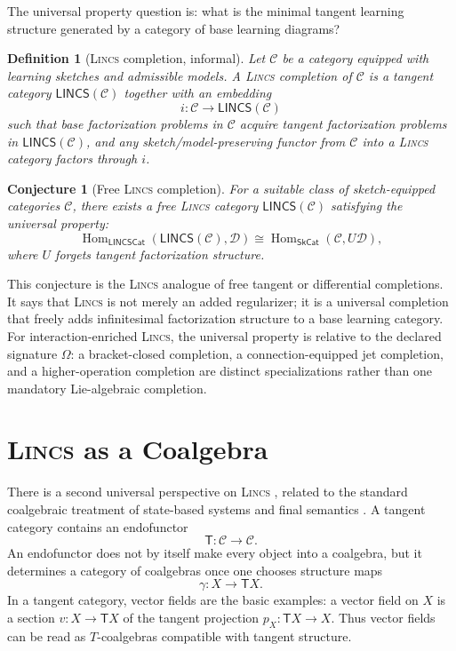\documentclass{article}
\newtheorem{definition}{Definition}
\newtheorem{conjecture}{Conjecture}
\newcommand{\C}{\mathcal{C}}
\newcommand{\D}{\mathcal{D}}
\newcommand{\T}{\mathsf{T}}
\newcommand{\LINCS}{\mathsf{LINCS}}
\newcommand{\Hom}{\operatorname{Hom}}
\begin{document}
The universal property question is: what is the minimal tangent learning structure generated by a category of base learning diagrams?

\begin{definition}[\textsc{Lincs}   completion, informal]
Let \(\C\) be a category equipped with learning sketches and admissible models. A \textsc{Lincs}   completion of \(\C\) is a tangent category \(\LINCS(\C)\) together with an embedding
\[
i:\C\to\LINCS(\C)
\]
such that base factorization problems in \(\C\) acquire tangent factorization problems in \(\LINCS(\C)\), and any sketch/model-preserving functor from \(\C\) into a \textsc{Lincs}   category factors through \(i\).
\end{definition}

\begin{conjecture}[Free \textsc{Lincs}   completion]
For a suitable class of sketch-equipped categories \(\C\), there exists a free \textsc{Lincs}   category \(\LINCS(\C)\) satisfying the universal property:
\[
\Hom_{\mathsf{LINCSCat}}(\LINCS(\C),\D)
  \cong
  \Hom_{\mathsf{SkCat}}(\C,U\D),
\]
where \(U\) forgets tangent factorization structure.
\end{conjecture}

This conjecture is the \textsc{Lincs}   analogue of free tangent or differential completions. It says that \textsc{Lincs}   is not merely an added regularizer; it is a universal completion that freely adds infinitesimal factorization structure to a base learning category.  For interaction-enriched \textsc{Lincs}, the universal property is relative to the declared signature $\Omega$: a bracket-closed completion, a connection-equipped jet completion, and a higher-operation completion are distinct specializations rather than one mandatory Lie-algebraic completion.

\section{\textsc{Lincs}   as a Coalgebra}

There is a second universal perspective on \textsc{Lincs}  , related to the standard coalgebraic treatment of state-based systems and final semantics \citep{rutten2000universal}. A tangent category contains an endofunctor
\[
\T:\C\to\C.
\]
An endofunctor does not by itself make every object into a coalgebra, but it determines a category of coalgebras once one chooses structure maps
\[
\gamma:X\to\T X.
\]
In a tangent category, vector fields are the basic examples: a vector field on \(X\) is a section \(v:X\to\T X\) of the tangent projection \(p_X:\T X\to X\). Thus vector fields can be read as \(T\)-coalgebras compatible with tangent structure.
\end{document}
